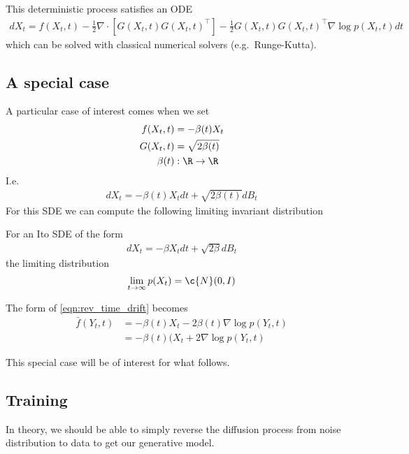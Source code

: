 This deterministic process satisﬁes an ODE \cite{song2020score}
\begin{align} \label{eq:ode}
dX_t = { f(X_t, t) - \frac{1}{2} \nabla \cdot[G(X_t, t)G(X_t, t)^\top] - \frac{1}{2} G(X_t,t)G(X_t, t)^\top \nabla \log p(X_t, t) } dt
\end{align}
which can be solved with classical numerical solvers (e.g.\ Runge-Kutta).


\subsection{A special case}

A particular case of interest comes when we set
\begin{align}
    f(X_t, t) &= -\beta(t) X_t \\
    G(X_t, t) &= \sqrt{2 \beta(t)} \\
    \beta(t) &: \R \to \R
\end{align}
I.e.
\begin{align}
dX_t = - \beta(t) X_t dt + \sqrt{2\beta(t)} dB_t
\end{align}
For this SDE we can compute the following limiting invariant distribution
\begin{lemma}
For an Ito SDE of the form 
\begin{align}
dX_t = - \beta X_t dt + \sqrt{2\beta} dB_t
\end{align}
the limiting distribution
\begin{align}
    \lim_{t \to \infty} p({X}_t) = \c{N}(0, I)
\end{align}
\end{lemma}
The form of \cref{eqn:rev_time_drift} becomes
\begin{align}
    \bar{f}(Y_t, t) &= - \beta(t) X_t - 2\beta(t) \nabla \log p(Y_t, t)\\
    &= -\beta(t)(X_t + 2 \nabla \log p(Y_t, t)
\end{align}

This special case will be of interest for what follows.


%
\subsection{Training}
In theory, we should be able to simply reverse the diffusion process from noise distribution to data to get our generative model.

